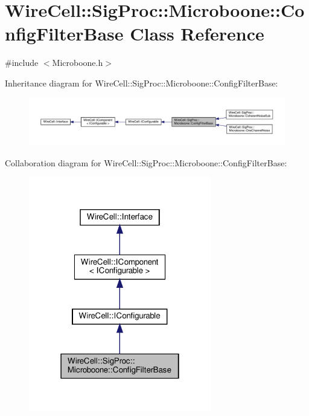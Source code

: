 \hypertarget{class_wire_cell_1_1_sig_proc_1_1_microboone_1_1_config_filter_base}{}\section{Wire\+Cell\+:\+:Sig\+Proc\+:\+:Microboone\+:\+:Config\+Filter\+Base Class Reference}
\label{class_wire_cell_1_1_sig_proc_1_1_microboone_1_1_config_filter_base}


{\ttfamily \#include $<$Microboone.\+h$>$}



Inheritance diagram for Wire\+Cell\+:\+:Sig\+Proc\+:\+:Microboone\+:\+:Config\+Filter\+Base\+:
\nopagebreak
\begin{figure}[H]
\begin{center}
\leavevmode
\includegraphics[width=350pt]{class_wire_cell_1_1_sig_proc_1_1_microboone_1_1_config_filter_base__inherit__graph}
\end{center}
\end{figure}


Collaboration diagram for Wire\+Cell\+:\+:Sig\+Proc\+:\+:Microboone\+:\+:Config\+Filter\+Base\+:
\nopagebreak
\begin{figure}[H]
\begin{center}
\leavevmode
\includegraphics[width=226pt]{class_wire_cell_1_1_sig_proc_1_1_microboone_1_1_config_filter_base__coll__graph}
\end{center}
\end{figure}
